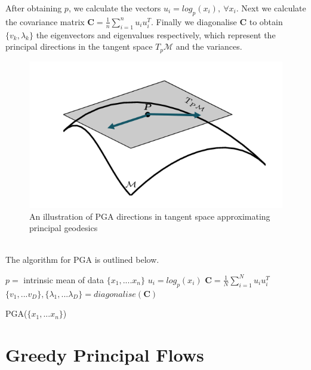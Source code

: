 \documentclass[12pt]{report}
\begin{document}
After obtaining $p$, we calculate the vectors $u_i = log_p(x_i), \ \forall x_i$.
Next we calculate the covariance matrix 
$\mathbf{C} = \frac{1}{n} \sum^n_{i=1} u_iu_i^T$.
Finally we diagonalise $\mathbf{C}$ to obtain $\{v_k, \lambda_k\}$ 
the eigenvectors and eigenvalues respectively, 
which represent the principal directions 
in the tangent space $T_p\mathcal{M}$ and the variances.
\begin{figure}[ht]
    \begin{center}
        \includegraphics[scale=0.45]{pga_directions.PNG}
        \caption{An illustration of PGA directions 
        in tangent space approximating principal geodesics}
        \label{fig:Directions On Tangent Space}
    \end{center}
\end{figure}\\
The algorithm for PGA is outlined below.
\begin{algorithm}
    $p = $ intrinsic mean of data $\{x_1,....x_n\}$\;
    $u_i = log_p(x_i)$\;
    $\mathbf{C} = \frac{1}{N}\sum^N_{i=1}u_i u_i^T$\;
    $\{v_1,...v_D\}, \{\lambda_1,...\lambda_D\} = diagonalise(\mathbf{C})$\;
    \caption{PGA($\{x_1,...x_n\}$)}
\end{algorithm}

\chapter{Greedy Principal Flows}
\end{document}
